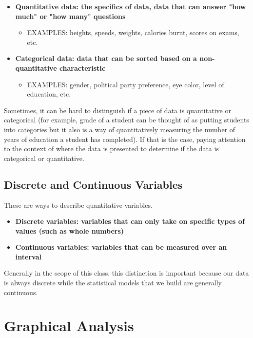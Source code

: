 \begin{itemize}
    \item \bf{Quantitative data:} the specifics of data, data that can answer "how much" or "how many" questions
    \begin{itemize}
        \item EXAMPLES: heights, speeds, weights, calories burnt, scores on exams, etc.
    \end{itemize}

    \item \bf{Categorical data:} data that can be sorted based on a non-quantitative characteristic
    \begin{itemize}
        \item EXAMPLES: gender, political party preference, eye color, level of education, etc.
    \end{itemize}
\end{itemize}

Sometimes, it can be hard to distinguish if a piece of data is quantitative or categorical (for example, grade of a student can be thought of as putting students into categories but it also is a way of quantitatively measuring the number of years of education a student has completed). If that is the case, paying attention to the context of where the data is presented to determine if the data is categorical or quantitative.



\subsection{Discrete and Continuous Variables}

These are ways to describe quantitative variables.

\begin{itemize}
    \item \bf{Discrete variables:} variables that can only take on specific types of values (such as whole numbers)
    \item \bf{Continuous variables:} variables that can be measured over an interval 
\end{itemize}

Generally in the scope of this class, this distinction is important because our data is always discrete while the statistical models that we build are generally continuous.




\section{Graphical Analysis}

